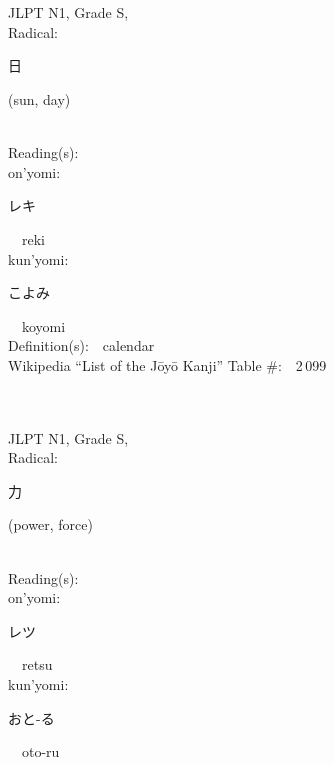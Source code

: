 \begin{multicols}{2}
\ \ \\
{\fontsize{34pt}{40pt}  }\ \ \\
{JLPT N1, Grade S, \\Radical:\ \ {\begin{CJK}{UTF8}{min} 日 \end{CJK}} (sun, day) } \\
Reading(s):\ \ \\
{\hspace*{1em}}on'yomi:\ \ \\
{\hspace*{2em}}{\begin{CJK}{UTF8}{min} レキ \end{CJK}}\ \ reki\ \ \\
{\hspace*{1em}}kun'yomi:\ \ \\
{\hspace*{2em}}{\begin{CJK}{UTF8}{min} こよみ \end{CJK}}\ \ koyomi\ \ \\
Definition(s):\ \ calendar \\
Wikipedia ``List of the J\=oy\=o Kanji'' Table \#:\ \ 2\,099 \\
\ \ \\
{\fontsize{34pt}{40pt}  }\ \ \\
{JLPT N1, Grade S, \\Radical:\ \ {\begin{CJK}{UTF8}{min} 力 \end{CJK}} (power, force) } \\
Reading(s):\ \ \\
{\hspace*{1em}}on'yomi:\ \ \\
{\hspace*{2em}}{\begin{CJK}{UTF8}{min} レツ \end{CJK}}\ \ retsu\ \ \\
{\hspace*{1em}}kun'yomi:\ \ \\
{\hspace*{2em}}{\begin{CJK}{UTF8}{min} おと-る \end{CJK}}\ \ oto-ru\ \ \\

\end{multicols}
